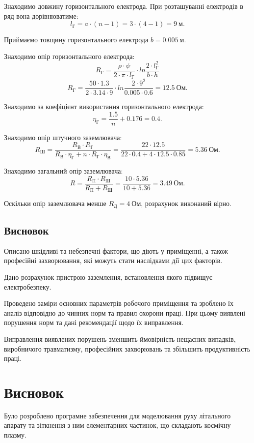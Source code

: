 \documentclass[a4paper,12pt]{article}
\begin{document}
Знаходимо довжину горизонтального електрода. При розташуванні електродів в ряд вона дорівнюватиме:
\[
l_\text{Г} = a \cdot (n - 1) = 3 \cdot (4 - 1) = 9\ \text{м}.
\]

Приймаємо товщину горизонтального електрода $b = 0.005\ \text{м}$.

Знаходимо опір горизонтального електрода:
\[
R_\text{Г} = \frac{\rho \cdot \psi}{2 \cdot \pi \cdot l_\text{Г}} \cdot ln \frac{2 \cdot l_\text{Г}^2}{b \cdot h}
\]
\[
R_\text{Г} = \frac{50 \cdot 1.3}{2 \cdot 3.14 \cdot 9} \cdot ln \frac{2 \cdot 9^2}{0.005 \cdot 0.6} = 12.5\ \text{Ом}.
\]

Знаходимо за \cite{dzunzuk} коефіцієнт використання горизонтального електрода:
\[
\eta_\text{Г} = \frac{1.5}{n} + 0.176 = 0.4.
\]

Знаходимо опір штучного заземлювача:
\[
R_\text{Ш} = \frac{R_\text{В} \cdot R_\text{Г}}{R_\text{В} \cdot \eta_\text{Г} + n \cdot R_\text{Г} \cdot \eta_\text{В}} = \frac{22 \cdot 12.5}{22 \cdot 0.4 + 4 \cdot 12.5 \cdot 0.85} = 5.36\ \text{Ом}.
\]

Знаходимо загальний опір заземлювача:
\[
R = \frac{R_\text{П} \cdot R_\text{Ш}}{R_\text{П} + R_\text{Ш}} = \frac{10 \cdot 5.36}{10 + 5.36} = 3.49\ \text{Ом}.
\]

Оскільки опір заземлювача менше $R_\text{Д}=4\ \text{Ом}$, розрахунок виконаний вірно.

\subsection{Висновок}
Описано шкідливі та небезпечні фактори, що діють у приміщенні, а також професійні захворювання, які можуть стати наслідками дії цих факторів.

Дано розрахунок пристрою заземлення, встановлення якого підвищує електробезпеку.

Проведено заміри основних параметрів робочого приміщення та зроблено їх аналіз відповідно до чинних норм та правил охорони праці. При цьому виявлені порушення норм та дані рекомендації щодо їх виправлення.

Виправлення виявлених порушень зменшить ймовірність нещасних випадків, виробничого травматизму, професійних захворювань та збільшить продуктивність праці.
\newpage

\section*{Висновок}
Було розроблено програмне забезпечення для моделювання руху літального апарату та зіткнення з ним елементарних частинок, що складають космічну плазму.
\end{document}
